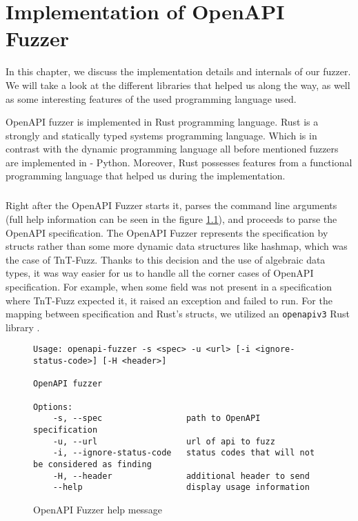 \chapter{Implementation of OpenAPI Fuzzer}
In this chapter, we discuss the implementation details and internals of our fuzzer. We will take a look at the different libraries that helped us along the way, as well as some interesting features of the used programming language used.

OpenAPI fuzzer is implemented in Rust programming language. Rust is a strongly and statically typed systems programming language. Which is in contrast with the dynamic programming language all before mentioned fuzzers are implemented in - Python. Moreover, Rust possesses features from a functional programming language that helped us during the implementation.

\paragraph{}
Right after the OpenAPI Fuzzer starts it, parses the command line arguments (full help information can be seen in the figure \ref{fig:openapi-fuzzer-help}), and proceeds to parse the OpenAPI specification. The OpenAPI Fuzzer represents the specification by structs rather than some more dynamic data structures like hashmap, which was the case of TnT-Fuzz. Thanks to this decision and the use of algebraic data types, it was way easier for us to handle all the corner cases of OpenAPI specification. For example, when some field was not present in a specification where TnT-Fuzz expected it, it raised an exception and failed to run. For the mapping between specification and Rust's structs, we utilized an \texttt{openapiv3} Rust library \cite{openapiv32020github}.

\begin{figure}
\begin{verbatim}
Usage: openapi-fuzzer -s <spec> -u <url> [-i <ignore-status-code>] [-H <header>]

OpenAPI fuzzer

Options:
    -s, --spec                 path to OpenAPI specification
    -u, --url                  url of api to fuzz
    -i, --ignore-status-code   status codes that will not be considered as finding
    -H, --header               additional header to send
    --help                     display usage information
\end{verbatim}
\caption{OpenAPI Fuzzer help message}
\label{fig:openapi-fuzzer-help}
\end{figure}

